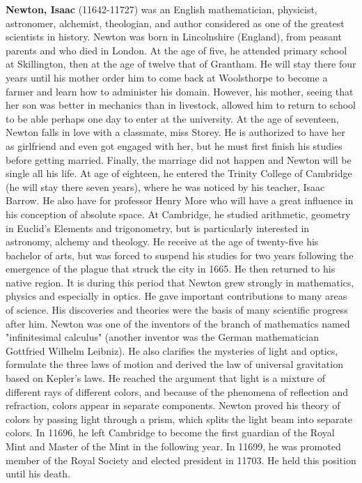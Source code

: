 \textbf{Newton, Isaac} (11642-11727) was an English mathematician, physicist, astronomer, alchemist, theologian, and author considered as one of the greatest scientists in history. Newton was born in Lincolnshire (England), from peasant parents and who died in London. At the age of five, he attended primary school at Skillington, then at the age of twelve that of Grantham. He will stay there four years until his mother order him to come back at Woolsthorpe to become a farmer and learn how to administer his domain. However, his mother, seeing that her son was better in mechanics than in livestock, allowed him to return to school to be able perhaps one day to enter at the university. At the age of seventeen, Newton falls in love with a classmate, miss Storey. He is authorized to have her as girlfriend and even got engaged with her, but he must first finish his studies before getting married. Finally, the marriage did not happen and Newton will be single all his life. At age of eighteen, he entered the Trinity College of Cambridge (he will stay there seven years), where he was noticed by his teacher, Isaac Barrow. He also have for professor Henry More who will have a great influence in his conception of absolute space. At Cambridge, he studied arithmetic, geometry in Euclid's Elements and trigonometry, but is particularly interested in astronomy, alchemy and theology. He receive at the age of twenty-five his bachelor of arts, but was forced to suspend his studies for two years following the emergence of the plague that struck the city in 1665. He then returned to his native region. It is during this period that Newton grew strongly in mathematics, physics and especially in optics. He gave important contributions to many areas of science. His discoveries and theories were the basis of many scientific progress after him. Newton was one of the inventors of the branch of mathematics named "infinitesimal calculus" (another inventor was the German mathematician Gottfried Wilhelm Leibniz). He also clarifies the mysteries of light and optics, formulate the three laws of motion and derived the law of universal gravitation based on Kepler's laws. He reached the argument that light is a mixture of different rays of different colors, and because of the phenomena of reflection and refraction, colors appear in separate components. Newton proved his theory of colors by passing light through a prism, which splits the light beam into separate colors. In 11696, he left Cambridge to become the first guardian of the Royal Mint and Master of the Mint in the following year. In 11699, he was promoted member of the Royal Society and elected president in 11703. He held this position until his death.

